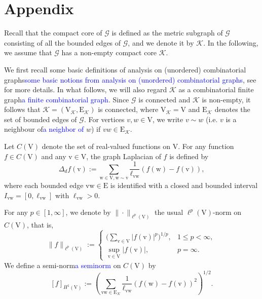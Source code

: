 \documentclass[11pt]{amsart}
\newcommand{\blue}[1]{\textcolor{blue}{#1}}
\newcommand{\purple}[1]{\textcolor{revisionpurple}{#1}}
\newcommand{\G}{\mathcal{G}}
\newcommand{\K}{\mathcal{K}}
\newcommand{\E}{\mathrm{E}}
\newcommand{\V}{\mathrm{V}}
\newcommand{\vv}{\mathrm{v}}
\newcommand{\w}{\mathrm{w}}
\numberwithin{equation}{section}
\begin{document}
\section{Appendix}
Recall that the compact core of $\G$ is defined as the metric subgraph of $\G$ consisting of all the bounded edges of $\G$, and we denote it by $\K$. In the following, we assume that $\G$ has a non-empty compact core $\K$. 

We first recall \purple{some basic definitions of analysis on (unordered) combinatorial graphs}\blue{some basic notions from analysis on (unordered) combinatorial graphs}, see \cite{Gri0} for more details. In what follows, we will also regard $\K$ as \purple{a combinatorial finite graph}\blue{a finite combinatorial graph}. Since $\G$ is connected and $\K$ is non-empty, it follows that $\K=(\V_\K,\E_\K)$ is connected, where $\V_\K=\V$ and $\E_\K$ denotes the set of bounded edges of $\G$. For vertices $v, w\in \V$,   we write $v \sim w$ (i.e. $v$ is \purple{a neighbour of}\blue{a neighbor of} $w$) if $vw \in \E_\K$.

Let $C(\V)$ denote the set of real-valued functions on $\V$. For any function $f\in C(\V)$ and any $\vv \in \V$, the graph Laplacian of $f$ is defined by
$$
\Delta_d f(\vv):=\sum_{\w \in \V, \w\sim \vv}\frac{1}{\ell_{\vv\w}}(f(\w)-f(\vv)),
$$
where each bounded edge $\vv\w \in \E$ is identified with a closed and bounded interval $I_{\vv\w} = [0, \ell_{\vv\w}]$ with $\ell_{\vv\w} > 0$.


For any $p \in[1, \infty]$, we denote by $\|\cdot\|_{\ell^p(\V)}$ the usual $\ell^p(\V)$-norm on $C(\V)$, that is, 
$$
\|f\|_{\ell^p(\V)}:=\left\{\begin{array}{lc}\displaystyle
\Big(\sum_{\vv \in \V}|f(\vv)|^p\Big)^{1/p}, & 1 \leq p<\infty, \\
\displaystyle\sup _{\vv \in \V}|f(\vv)|, & p=\infty .
\end{array}\right.
$$
We define \purple{a semi-norm}\blue{a seminorm} on $C(\V)$ by
$$
[f]_{H^1(\V)}:= \left( \sum_{\vv\w \in \E_\K}\frac{1}{\ell_{\vv\w}}(f(\w)-f(\vv))^2\right)^{1 / 2}.
$$
\end{document}
